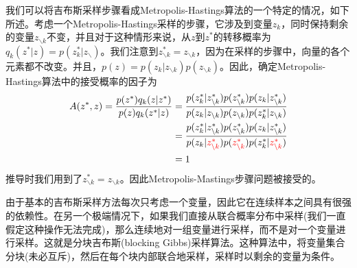 我们可以将吉布斯采样步骤看成Metropolis-Hastings算法的一个特定的情况，如下所述。考虑一个Metropolis-Hastings采样的步骤，它涉及到变量$z_k$，同时保持剩余的变量$z_{\backslash k}$不变，并且对于这种情形来说，从$z$到$z^*$的转移概率为$q_k(z^*|z)=p(z_k^*|z_{\backslash})$。我们注意到$z_{\backslash k}^*=z_{\backslash k}$，因为在采样的步骤中，向量的各个元素都不改变。并且，$p(z)=p(z_k|z_{\backslash k})p(z_{\backslash k})$。因此，确定Metropolis-Hastings算法中的接受概率的因子为
\begin{equation}
\begin{aligned}
	A(z^*,z)=\frac{p(z^*)q_k(z|z^*)}{p(z)q_k(z^*|z)}&=\frac{p(z_k^*|z_{\backslash k}^*)p(z_{\backslash k}^*)p(z_k|z_{\backslash k}^*)}{p(z_k|z_{\backslash k})p(z_{\backslash k})p(z_k^*|z_{\backslash k})}\\
	&=\frac{p(z_k^*|z_{\backslash k}^*)p(z_{\backslash k}^*)p(z_k|z_{\backslash k}^*)}{p(z_k|{\color{red}{z_{\backslash k}^*}})p({\color{red}{z_{\backslash k}^*}})p(z_k^*|{\color{red}{z_{\backslash k}^*}})}\\
	&=1
\end{aligned}
\end{equation}
推导时我们用到了$z_{\backslash k}^*=z_{\backslash k}$。因此Metropolis-Mastings步骤问题被接受的。

由于基本的吉布斯采样方法每次只考虑一个变量，因此它在连续样本之间具有很强的依赖性。在另一个极端情况下，如果我们直接从联合概率分布中采样(我们一直假定这种操作无法完成)，那么连续地对一组变量进行采样，而不是对一个变量进行采样。这就是分块吉布斯(blocking Gibbs)采样算法。这种算法中，将变量集合分块(未必互斥)，然后在每个块内部联合地采样，采样时以剩余的变量为条件。
